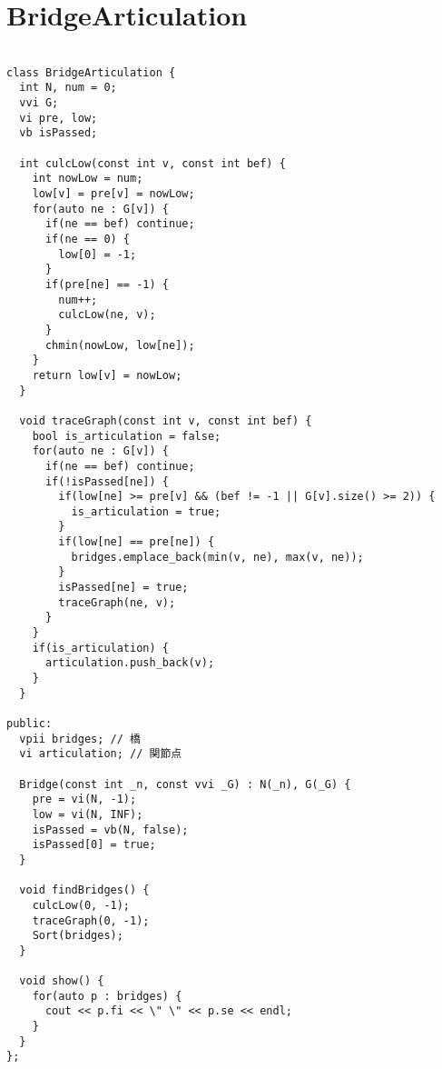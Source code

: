 \documentclass[a4j,titlepage]{jarticle} %
\begin{document}
\section{BridgeArticulation}
\color{black}
\begin{lstlisting}[caption=BridgeArticulation]

class BridgeArticulation {
  int N, num = 0;
  vvi G;
  vi pre, low;
  vb isPassed;

  int culcLow(const int v, const int bef) {
    int nowLow = num;
    low[v] = pre[v] = nowLow;
    for(auto ne : G[v]) {
      if(ne == bef) continue;
      if(ne == 0) {
        low[0] = -1;
      }
      if(pre[ne] == -1) {
        num++;
        culcLow(ne, v);
      }
      chmin(nowLow, low[ne]);
    }
    return low[v] = nowLow;
  }

  void traceGraph(const int v, const int bef) {
    bool is_articulation = false;
    for(auto ne : G[v]) {
      if(ne == bef) continue;
      if(!isPassed[ne]) {
        if(low[ne] >= pre[v] && (bef != -1 || G[v].size() >= 2)) {
          is_articulation = true;
        }
        if(low[ne] == pre[ne]) {
          bridges.emplace_back(min(v, ne), max(v, ne));
        }
        isPassed[ne] = true;
        traceGraph(ne, v);
      }
    }
    if(is_articulation) {
      articulation.push_back(v);
    }
  }

public:
  vpii bridges; // 橋
  vi articulation; // 関節点

  Bridge(const int _n, const vvi _G) : N(_n), G(_G) {
    pre = vi(N, -1);
    low = vi(N, INF);
    isPassed = vb(N, false);
    isPassed[0] = true;
  }

  void findBridges() {
    culcLow(0, -1);
    traceGraph(0, -1);
    Sort(bridges);
  }

  void show() {
    for(auto p : bridges) {
      cout << p.fi << \" \" << p.se << endl; 
    }
  }
};

\end{lstlisting}

\color{white}
\end{document}
